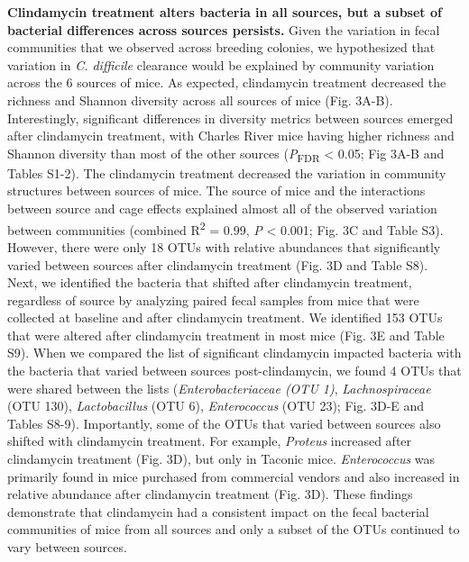 \documentclass[
  11pt,
]{article}
\begin{document}
\textbf{Clindamycin treatment alters bacteria in all sources, but a
subset of bacterial differences across sources persists.} Given the
variation in fecal communities that we observed across breeding
colonies, we hypothesized that variation in \emph{C. difficile}
clearance would be explained by community variation across the 6 sources
of mice. As expected, clindamycin treatment decreased the richness and
Shannon diversity across all sources of mice (Fig. 3A-B). Interestingly,
significant differences in diversity metrics between sources emerged
after clindamycin treatment, with Charles River mice having higher
richness and Shannon diversity than most of the other sources
(\emph{P}\textsubscript{FDR} \textless{} 0.05; Fig 3A-B and Tables
S1-2). The clindamycin treatment decreased the variation in community
structures between sources of mice. The source of mice and the
interactions between source and cage effects explained almost all of the
observed variation between communities (combined R\textsuperscript{2} =
0.99, \emph{P} \textless{} 0.001; Fig. 3C and Table S3). However, there
were only 18 OTUs with relative abundances that significantly varied
between sources after clindamycin treatment (Fig. 3D and Table S8).
Next, we identified the bacteria that shifted after clindamycin
treatment, regardless of source by analyzing paired fecal samples from
mice that were collected at baseline and after clindamycin treatment. We
identified 153 OTUs that were altered after clindamycin treatment in
most mice (Fig. 3E and Table S9). When we compared the list of
significant clindamycin impacted bacteria with the bacteria that varied
between sources post-clindamycin, we found 4 OTUs that were shared
between the lists (\emph{Enterobacteriaceae (OTU 1)},
\emph{Lachnospiraceae} (OTU 130), \emph{Lactobacillus} (OTU 6),
\emph{Enterococcus} (OTU 23); Fig. 3D-E and Tables S8-9). Importantly,
some of the OTUs that varied between sources also shifted with
clindamycin treatment. For example, \emph{Proteus} increased after
clindamycin treatment (Fig. 3D), but only in Taconic mice.
\emph{Enterococcus} was primarily found in mice purchased from
commercial vendors and also increased in relative abundance after
clindamycin treatment (Fig. 3D). These findings demonstrate that
clindamycin had a consistent impact on the fecal bacterial communities
of mice from all sources and only a subset of the OTUs continued to vary
between sources.
\end{document}

